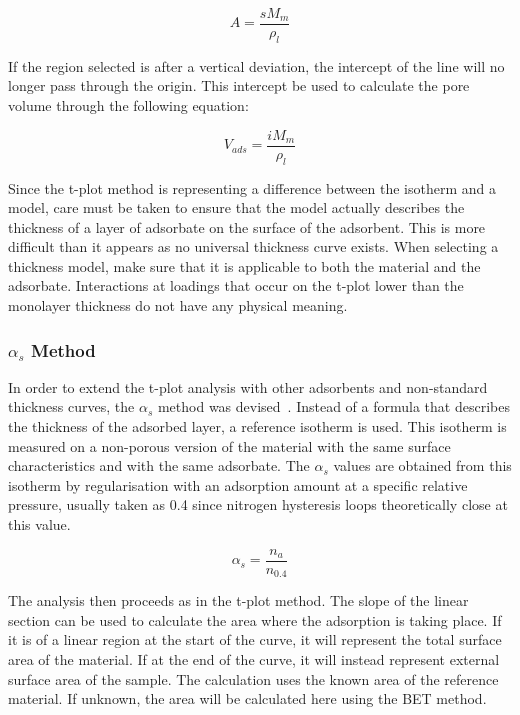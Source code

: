 \begin{equation}
	A = \frac{s M_m}{\rho_{l}}
\end{equation}

If the region selected is after a vertical deviation, the intercept of the line
will no longer pass through the origin. This intercept be used to calculate the
pore volume through the following equation:

\begin{equation}
	V_{ads} = \frac{i M_m}{\rho_{l}}
\end{equation}

Since the t-plot method is representing a difference between the
isotherm and a model, care must be taken to ensure that the model
actually describes the thickness of a layer of adsorbate on the
surface of the adsorbent. This is more difficult than it
appears as no universal thickness curve exists.
When selecting a thickness model, make sure that it is applicable
to both the material and the adsorbate.
Interactions at loadings that occur on the t-plot lower than the monolayer
thickness do not have any physical meaning.

\subsubsection{\(\alpha_s\) Method}

In order to extend the t-plot analysis with other adsorbents and non-standard
thickness curves, the \(\alpha_s\) method was 
devised~\cite{atkinsonAdsorptivePropertiesMicroporous1984}.
Instead of a formula that describes the thickness of the adsorbed layer, 
a reference isotherm is used. This isotherm is measured on a non-porous 
version of the material with the same surface characteristics and with 
the same adsorbate.
The \(\alpha_s\) values are obtained from this isotherm by regularisation with
an adsorption amount at a specific relative pressure, usually taken as 0.4 since
nitrogen hysteresis loops theoretically close at this value.

\begin{equation}
	\alpha_s = \frac{n_a}{n_{0.4}}
\end{equation}

The analysis then proceeds as in the t-plot method. 
The slope of the linear section can be used to calculate the area
where the adsorption is taking place. If it is of a linear region
at the start of the curve, it will represent the total surface area
of the material. If at the end of the curve, it will instead
represent external surface area of the sample.
The calculation uses the known area of the reference material.
If unknown, the area will be calculated here using the BET method.

